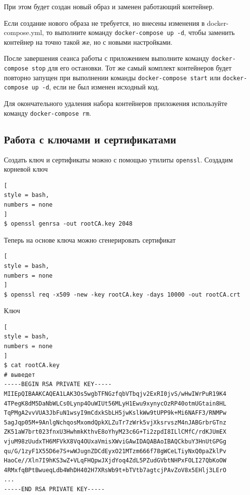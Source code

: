 \documentclass[%
	11pt,
	a4paper,
	utf8,
		]{article}
\begin{document}
При этом будет создан новый образ и заменен работающий контейнер.


Если создание нового образа не требуется, но внесены изменения в docker-compose.yml, то выполните команду \texttt{docker-compose up -d}, чтобы заменить контейнер на точно такой же, но с новыми настройками.

После завершения сеанса работы с приложением выполните команду \texttt{docker-compose stop} для его остановки. Тот же самый комплект контейнеров будет повторно запущен при выполнении команды \texttt{docker-compose start} или \texttt{docker-compose up -d}, если не был изменен исходный код.

Для окончательного удаления набора контейнеров приложения используйте команду \texttt{docker-compose rm}.



\subsection{Работа с ключами и сертификатами}

Создать ключ и сертификаты можно с помощью утилиты \texttt{openssl}. Создадим корневой ключ
\begin{lstlisting}[
style = bash,
numbers = none
]
$ openssl genrsa -out rootCA.key 2048
\end{lstlisting}

Теперь на основе ключа можно сгенерировать сертификат
\begin{lstlisting}[
style = bash,
numbers = none
]
$ openssl req -x509 -new -key rootCA.key -days 10000 -out rootCA.crt
\end{lstlisting}

Ключ
\begin{lstlisting}[
style = bash,
numbers = none
]
$ cat rootCA.key
# выведет
-----BEGIN RSA PRIVATE KEY-----
MIIEpQIBAAKCAQEA1LAK3Os5wgbTFNGzfqbVTbqjv2ExRI0jvS/wHwIWrPuR19K4
4TPegK8dM5DaNbWLCs0Lynp4OuWIUt56MLyH1Ewu9xynycOzRP40otmUGtain8HL
TqPMgA2vvVUA3JbFuN1wsyI9mCdxkSbLH5jwKslkWw9tUPP9k+Mi6NAFF3/RNMPw
5agJqp05M+9AnlgNchqosMxomdQpkXLZuTr7zWrk5vjXksrvszM4nJABGrbrGTnz
ZK51aW7brt023fnxU3HwhmkKthvE8oYhyM23c6G+Ti2zpdI8ILlCMfC/rdKJUmEX
vjuM98zUudxTH6MFVkX8Vq4OUxaVmisXWviGAwIDAQABAoIBAQCkbuY3HnUtGPGg
qu/G/1zyF1X55D6e7S+wWJugnZDCdEyxO21MTzm666f78gWCeLTiyNxQ0paZklPv
HaoCe//Xln7I9hKS3wZ+VLqFHQpwJXjdYoq4ZdL5PZudGVbtNHPxFOLI27QbKoOW
4RMxfqBPtBwueqLdb4WhDH402H7XRsWb9t+bTVtb7agtcjPAvZoV8x5EHlj3LErO
...
-----END RSA PRIVATE KEY-----
\end{lstlisting}
\end{document}
